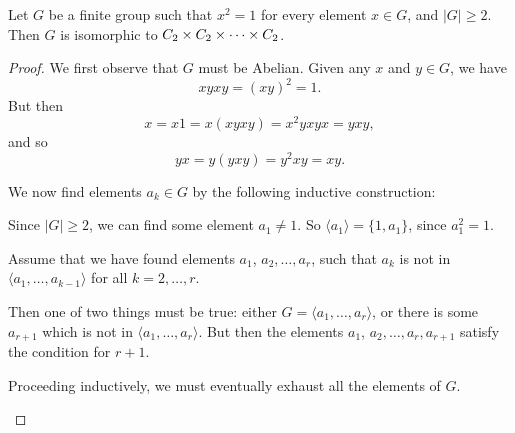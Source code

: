 \begin{theorem}\label{thm:order2group}
  Let $G$ be a finite group such that $x^{2} = 1$ for every element $x \in G$,
  and $|G| \ge 2$.
  Then $G$ is isomorphic to $C_{2} \times C_{2} \times \cdots \times C_{2}$.
\end{theorem}
\begin{proof}
  We first observe that $G$ must be Abelian.  Given any $x$ and $y \in G$,
  we have
  \[
    xyxy = (xy)^{2} = 1.
  \]
  But then
  \[
    x = x1 = x(xyxy) = x^{2}yxyx = yxy,
  \]
  and so
  \[
    yx = y(yxy) = y^{2}xy = xy.
  \]
  
  We now find elements $a_{k} \in G$ by the following inductive construction:
  \begin{theoremenum}
    \item Since $|G| \ge 2$, we can find some element $a_{1} \ne 1$.  So
      $\langle a_{1} \rangle = \{1, a_{1}\}$, since $a_{1}^{2} = 1$.
    
    \item Assume that we have found elements $a_{1}$, $a_{2}, \ldots, a_{r}$,
      such that $a_{k}$ is not in $\langle a_{1}, \ldots, a_{k-1} \rangle$ for
      all $k = 2, \ldots, r$.
      
      Then one of two things must be true: either
      $G = \langle a_{1}, \ldots, a_{r} \rangle$, or there is some $a_{r+1}$
      which is not in $\langle a_{1}, \ldots, a_{r} \rangle$. 
      But then the elements $a_{1}$, $a_{2}, \ldots, a_{r}, a_{r+1}$ satisfy
      the condition for $r+1$.
    
    \item Proceeding inductively, we must eventually exhaust all the elements
      of $G$.
  \end{theoremenum}
  

\end{proof}
